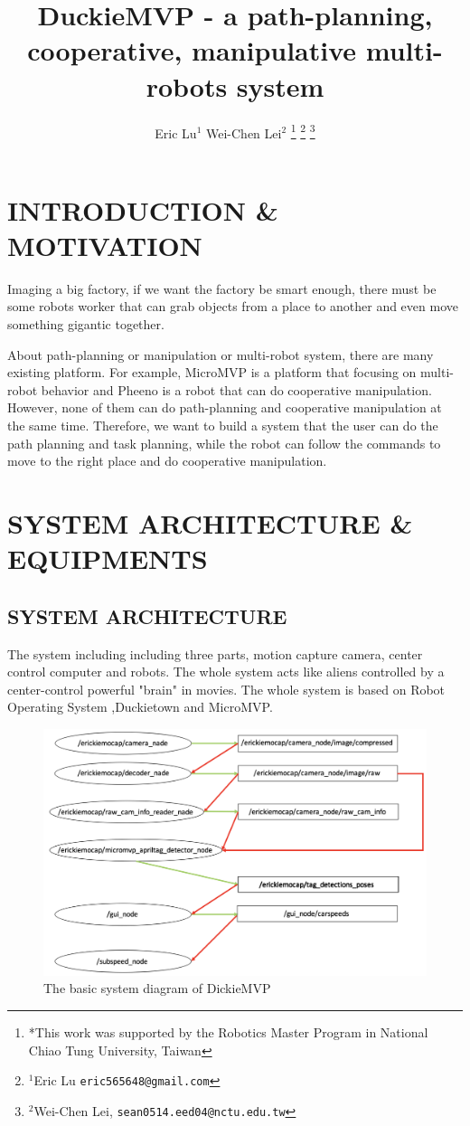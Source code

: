\documentclass[letterpaper, 10 pt, conference]{ieeeconf}  %
\title{\LARGE \bf
DuckieMVP - a path-planning, cooperative, manipulative multi-robots system
}
\author{Eric Lu$^{1}$ Wei-Chen Lei$^{2}$%
\thanks{*This work was supported by the Robotics Master Program in National Chiao Tung University, Taiwan}%
\thanks{$^{1}$Eric Lu
        {\tt\small eric565648@gmail.com}}%
\thanks{$^{2}$Wei-Chen Lei,
        {\tt\small sean0514.eed04@nctu.edu.tw}}%
}
\begin{document}
\maketitle
\thispagestyle{empty}
\pagestyle{empty}


\section{INTRODUCTION \& MOTIVATION}

Imaging a big factory, if we want the factory be smart enough, there must be some robots worker that can grab objects from a place to another and even move something gigantic together.

About path-planning or manipulation or multi-robot system, there are many existing platform. For example, MicroMVP is a platform that focusing on multi-robot behavior and Pheeno is a robot that can do cooperative manipulation. However, none of them can do path-planning and cooperative manipulation at the same time. Therefore, we want to build a system that the user can do the path planning and task planning, while the robot can follow the commands to move to the right place and do cooperative manipulation.

\section{SYSTEM ARCHITECTURE \& EQUIPMENTS}

\subsection{SYSTEM ARCHITECTURE}
The system including including three parts, motion capture camera, center control computer and robots. The whole system acts like aliens controlled by a center-control powerful "brain" in movies. The whole system is based on Robot Operating System ,Duckietown and MicroMVP.
\begin{figure}[h] %
\includegraphics[width=0.95\columnwidth]{system_diagram}
\centering
\caption{The basic system diagram of DickieMVP}
 \label{figure:system_diagramr}
\end{figure}
\end{document}
